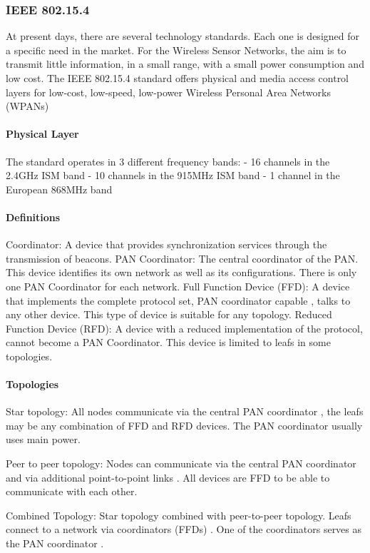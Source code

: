 \subsubsection{IEEE 802.15.4}
At present days,
	there are several technology standards.
Each one is designed for a specific need in the market.
For the Wireless Sensor Networks,
	the aim is to transmit little information,
	in a small range,
	with a small power consumption and low cost.
The IEEE 802.15.4 standard offers physical and media access control layers for low-cost,
	low-speed,
	low-power Wireless Personal Area Networks (WPANs)

\paragraph{Physical Layer}
The standard operates in 3 different frequency bands:
- 16 channels in the 2.4GHz ISM band
- 10 channels in the 915MHz ISM band
- 1 channel in the European 868MHz band


\paragraph{Definitions}
Coordinator:
	A device that provides synchronization services through the transmission of beacons.
PAN Coordinator:
	The central coordinator of the PAN.
This device identifies its own network as well as its configurations.
There is only one PAN Coordinator for each network.
Full Function Device (FFD):
	A device that implements the complete protocol set,
	PAN coordinator capable ,
	talks to any other device.
This type of device is suitable for any topology.
Reduced Function Device (RFD):
	A device with a reduced implementation of the protocol,
	cannot become a PAN Coordinator.
This device is limited to leafs in some topologies.

\paragraph{Topologies}
Star topology:
	All nodes communicate via the central PAN coordinator ,
	the leafs may be any combination of FFD and RFD devices.
The PAN coordinator usually uses main power.

Peer to peer topology:
	Nodes can communicate via the central PAN coordinator and via additional point-to-point links .
All devices are FFD to be able to communicate with each other.


Combined Topology:
	Star topology combined with peer-to-peer topology.
Leafs connect to a network via coordinators (FFDs) .
One of the coordinators serves as the PAN coordinator .



